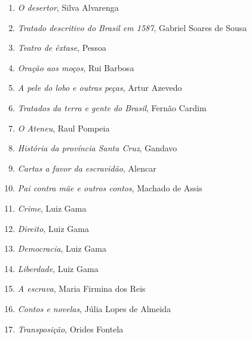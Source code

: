 \begin{enumerate}
\setlength\parskip{4.2pt}
\setlength\itemsep{-1.4mm}
\item \textit{O desertor}, Silva Alvarenga
\item \textit{Tratado descritivo do Brasil em 1587}, Gabriel Soares de Sousa
\item \textit{Teatro de êxtase}, Pessoa
\item \textit{Oração aos moços}, Rui Barbosa
\item \textit{A pele do lobo e outras peças}, Artur Azevedo
\item \textit{Tratados da terra e gente do Brasil}, Fernão Cardim 
\item \textit{O Ateneu}, Raul Pompeia
\item \textit{História da província Santa Cruz}, Gandavo
\item \textit{Cartas a favor da escravidão}, Alencar
\item \textit{Pai contra mãe e outros contos}, Machado de Assis
\item \textit{Crime}, Luiz Gama
\item \textit{Direito}, Luiz Gama
\item \textit{Democracia}, Luiz Gama
\item \textit{Liberdade}, Luiz Gama
\item \textit{A escrava}, Maria Firmina dos Reis
\item \textit{Contos e novelas}, Júlia Lopes de Almeida 
\item \textit{Transposição}, Orides Fontela

\end{enumerate}
